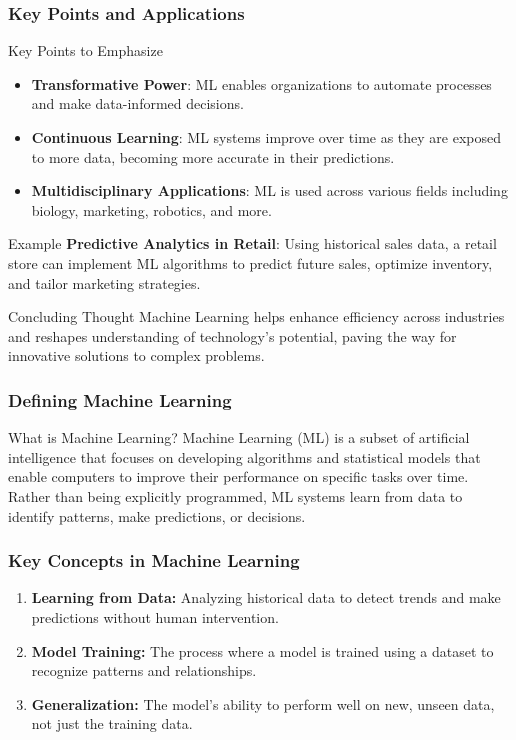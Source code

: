 \documentclass[aspectratio=169]{beamer}
\begin{document}
\begin{frame}[fragile]
    \frametitle{Key Points and Applications}
    \begin{block}{Key Points to Emphasize}
        \begin{itemize}
            \item \textbf{Transformative Power}: ML enables organizations to automate processes and make data-informed decisions.
            \item \textbf{Continuous Learning}: ML systems improve over time as they are exposed to more data, becoming more accurate in their predictions.
            \item \textbf{Multidisciplinary Applications}: ML is used across various fields including biology, marketing, robotics, and more.
        \end{itemize}
    \end{block}
    
    \begin{block}{Example}
        \textbf{Predictive Analytics in Retail}: Using historical sales data, a retail store can implement ML algorithms to predict future sales, optimize inventory, and tailor marketing strategies.
    \end{block}
    
    \begin{block}{Concluding Thought}
        Machine Learning helps enhance efficiency across industries and reshapes understanding of technology's potential, paving the way for innovative solutions to complex problems.
    \end{block}
\end{frame}

\begin{frame}[fragile]
    \frametitle{Defining Machine Learning}
    
    \begin{block}{What is Machine Learning?}
        Machine Learning (ML) is a subset of artificial intelligence that focuses on developing algorithms and statistical models that enable computers to improve their performance on specific tasks over time. Rather than being explicitly programmed, ML systems learn from data to identify patterns, make predictions, or decisions.
    \end{block}
\end{frame}

\begin{frame}[fragile]
    \frametitle{Key Concepts in Machine Learning}
    
    \begin{enumerate}
        \item \textbf{Learning from Data:} Analyzing historical data to detect trends and make predictions without human intervention.
        \item \textbf{Model Training:} The process where a model is trained using a dataset to recognize patterns and relationships.
        \item \textbf{Generalization:} The model's ability to perform well on new, unseen data, not just the training data.
    \end{enumerate}
\end{frame}
\end{document}

